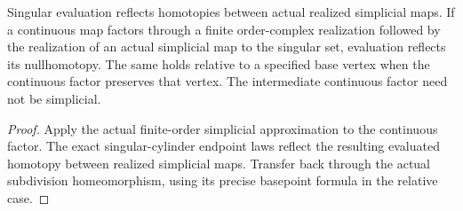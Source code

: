 \begin{proposition}
  \label{prop:actual-singular-order-nullhomotopy-reflection}
  \leanok
  Singular evaluation reflects homotopies between actual realized simplicial maps. If a continuous map factors through a finite order-complex realization followed by the realization of an actual simplicial map to the singular set, evaluation reflects its nullhomotopy. The same holds relative to a specified base vertex when the continuous factor preserves that vertex. The intermediate continuous factor need not be simplicial.
\end{proposition}
\begin{proof}
  Apply the actual finite-order simplicial approximation to the continuous factor. The exact singular-cylinder endpoint laws reflect the resulting evaluated homotopy between realized simplicial maps. Transfer back through the actual subdivision homeomorphism, using its precise basepoint formula in the relative case.
  \leanok
\end{proof}

